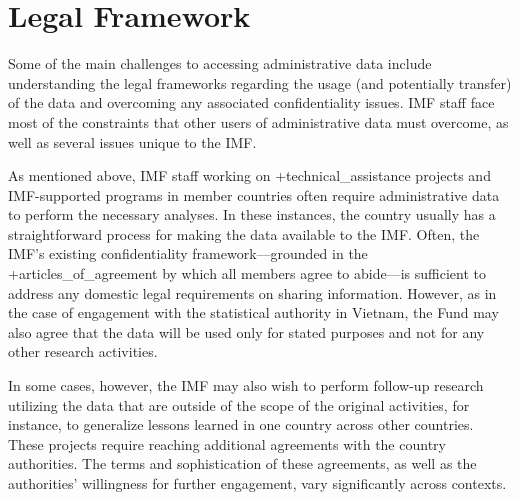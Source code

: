 \documentclass[
]{book}
\begin{document}
\hypertarget{legal-framework}{%
\section{Legal Framework}\label{legal-framework}}

Some of the main challenges to accessing administrative data include understanding the legal frameworks regarding the usage (and potentially transfer) of the data and overcoming any associated confidentiality issues. IMF staff face most of the constraints that other users of administrative data must overcome, as well as several issues unique to the IMF.

As mentioned above, IMF staff working on +technical\_assistance\textbar{} projects and IMF-supported programs in member countries often require administrative data to perform the necessary analyses. In these instances, the country usually has a straightforward process for making the data available to the IMF. Often, the IMF's existing confidentiality framework---grounded in the +articles\_of\_agreement\textbar{} by which all members agree to abide---is sufficient to address any domestic legal requirements on sharing information. However, as in the case of engagement with the statistical authority in Vietnam, the Fund may also agree that the data will be used only for stated purposes and not for any other research activities.

In some cases, however, the IMF may also wish to perform follow-up research utilizing the data that are outside of the scope of the original activities, for instance, to generalize lessons learned in one country across other countries. These projects require reaching additional agreements with the country authorities. The terms and sophistication of these agreements, as well as the authorities' willingness for further engagement, vary significantly across contexts.
\end{document}
